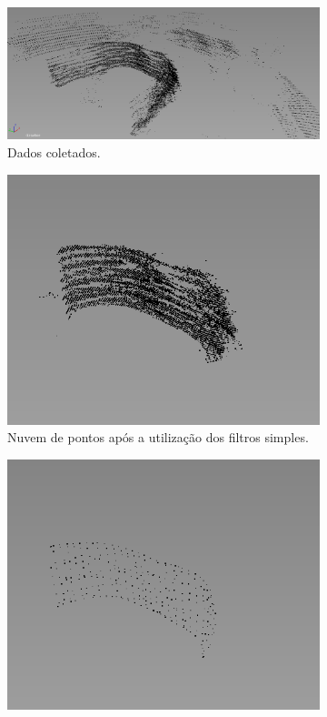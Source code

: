 \begin{figure}[H]
    \centering
    \begin{subfigure}[t]{1\textwidth}
        \includegraphics[width=\textwidth]{dados/figuras/perto_original.png}
        \caption{Dados coletados.}
    \end{subfigure}
    \begin{subfigure}[t]{0.327\textwidth}
        \includegraphics[width=\textwidth]{dados/figuras/perto_1.png}
        \caption{Nuvem de pontos após a utilização dos filtros simples.}
    \end{subfigure}
    \begin{subfigure}[t]{0.327\textwidth}
        \includegraphics[width=\textwidth]{dados/figuras/perto_2.png}

\end{subfigure}
\end{figure}
